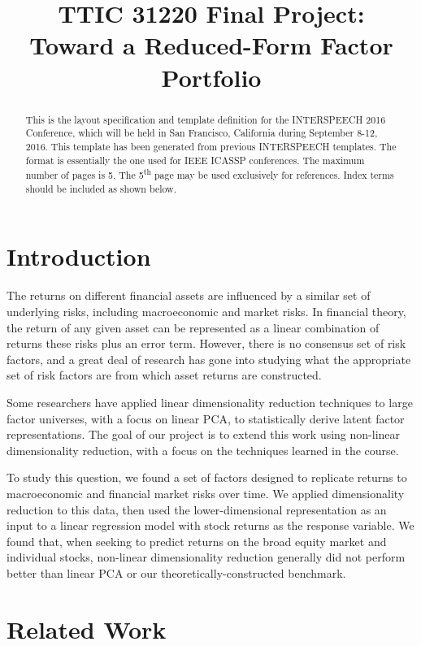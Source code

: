 \documentclass[a4paper]{article}
\title{TTIC 31220 Final Project: \\ Toward a Reduced-Form Factor Portfolio}
\begin{document}
  \maketitle
  \begin{abstract}
    This is the layout specification and template definition for the INTERSPEECH 2016 Conference, which will be held in San Francisco, California during September 8-12, 2016.
    This template has been generated from previous INTERSPEECH templates. 
    The format is essentially the one used for IEEE ICASSP conferences. 
    The maximum number of pages is 5. 
    The 5\textsuperscript{th} page may be used exclusively for references. 
    Index terms should be included as shown below.
  \end{abstract}



  \section{Introduction}

    The returns on different financial assets are influenced by a similar set of underlying risks, including macroeconomic and market risks. In financial theory, the return of any given asset can be represented as a linear combination of returns these risks plus an error term. However, there is no consensus set of risk factors, and a great deal of research has gone into studying what the appropriate set of risk factors are from which asset returns are constructed. 
    \par Some researchers have applied linear dimensionality reduction techniques to large factor universes, with a focus on linear PCA, to statistically derive latent factor representations. The goal of our project is to extend this work using non-linear dimensionality reduction, with a focus on the techniques learned in the course. 
    \par To study this question, we found a set of factors designed to replicate returns to macroeconomic and financial market risks over time. We applied dimensionality reduction to this data, then used the lower-dimensional representation as an input to a linear regression model with stock returns as the response variable. We found that, when seeking to predict returns on the broad equity market and individual stocks, non-linear dimensionality reduction generally did not perform better than linear PCA or our theoretically-constructed benchmark.

  
  \section{Related Work}
\end{document}
